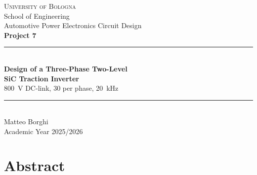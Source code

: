 \documentclass[11pt,a4paper,twoside,openright]{report}
\begin{document}

\begin{titlepage}
\centering
\vspace*{2cm}

{\Large\scshape University of Bologna}\\[0.3cm]
{\large School of Engineering}\\[2.5cm]

{\large Automotive Power Electronics Circuit Design}\\[0.4cm]
{\large\bfseries Project 7}\\[1.5cm]

\rule{\textwidth}{0.5pt}\\[0.6cm]
{\huge\bfseries Design of a Three-Phase Two-Level\\[0.2cm]
SiC Traction Inverter\\[0.4cm]}
{\large \SI{800}{\volt} DC-link, \SI{30}{\Arms} per phase, \SI{20}{\kilo\hertz}}\\[0.5cm]
\rule{\textwidth}{0.5pt}\\[2.5cm]

{\large Matteo Borghi}\\[2cm]

{\large Academic Year 2025/2026}

\vfill
\end{titlepage}

\cleardoublepage
{}

\chapter*{Abstract}


\cleardoublepage
\tableofcontents
\cleardoublepage
\listoffigures
\cleardoublepage
\listoftables

\cleardoublepage
{}












\cleardoublepage
{}
{}
\printbibliography[title={Bibliography}]

\appendix


\end{document}
